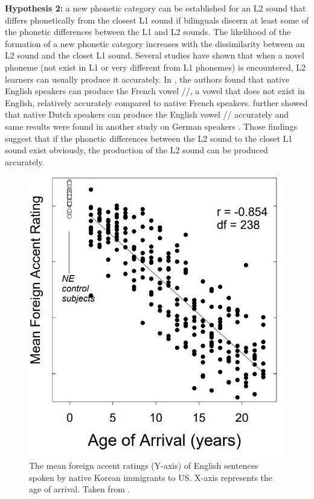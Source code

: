 \textbf{Hypothesis 2:} a new phonetic category can be established for an L2 sound that differs phonetically from the closest L1 sound if bilinguals discern at least some of the phonetic differences between the L1 and L2 sounds. The likelihood of the formation of a new phonetic category increases with the dissimilarity between an L2 sound and the closet L1 sound. Several studies have shown that when a novel phoneme (not exist in L1 or very different from L1 phonemes) is encountered, L2 learners can usually produce it accurately. In \citep{flege1987production}, the authors found that native English speakers can produce the French vowel //, a vowel that does not exist in English, relatively accurately compared to native French speakers. \cite{flege1997english} further showed that native Dutch speakers can produce the English vowel /\textipa{\ae}/ accurately and same results were found in another study on German speakers \citep{flege1997perception}. Those findings suggest that if the phonetic differences between the L2 sound to the closet L1 sound exist obviously, the production of the L2 sound can be produced accurately.

\begin{figure}
\centering
\captionsetup{justification=centering}
\includegraphics[width = 0.8\linewidth]{figures/accentedness_AOA.JPG}
\caption{The mean foreign accent ratings (Y-axis) of English sentences spoken by native Korean immigrants to US. X-axis represents the age of arrival. Taken from \citep{flege1999native}.}
\label{fig:accent_example}
\end{figure}

